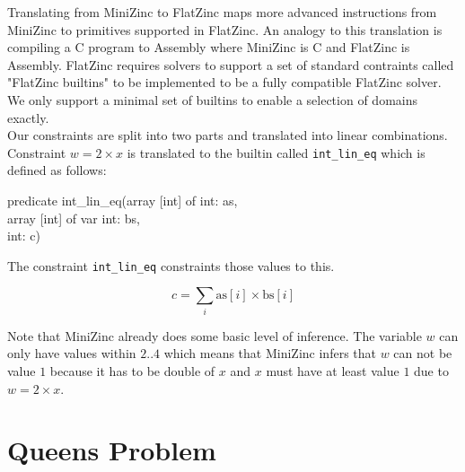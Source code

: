 Translating from MiniZinc to FlatZinc maps more advanced instructions from MiniZinc to primitives supported in FlatZinc. An analogy to this translation is compiling a C program to Assembly where MiniZinc is C and FlatZinc is Assembly. FlatZinc requires solvers to support a set of standard contraints called "FlatZinc builtins" to be implemented to be a fully compatible FlatZinc solver. We only support a minimal set of builtins to enable a selection of domains exactly. \\

Our constraints are split into two parts and translated into linear combinations. Constraint $w = 2 \times x$ is translated to the builtin called \verb|int_lin_eq| which is defined as follows:

\begin{tcolorbox}[title=int\_lin\_eq builtin]
	predicate int\_lin\_eq(array [int] of int: as,\\
	array [int] of var int: bs,\\
	int: c)
\end{tcolorbox}

The constraint \verb|int_lin_eq| constraints those values to this.

\begin{tcolorbox}[title=int\_lin\_eq builtin constraint]
	\begin{equation}
		c = \sum_{i} \text{as}[i] \times \text{bs}[i]
	\end{equation}
\end{tcolorbox}


Note that MiniZinc already does some basic level of inference. The variable $w$ can only have values within $2..4$ which means that MiniZinc infers that $w$ can not be value $1$ because it has to be double of $x$ and $x$ must have at least value $1$ due to $w = 2 \times x$.

\section{Queens Problem} \label{sec:queens}

